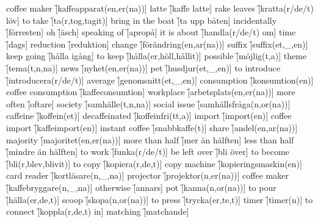 \begin{questions}
    \begin{multicols}{2}
        \raggedcolumns
        \question coffee maker \f[kaffeapparat(en,er(na))]
        \question latte \f[kaffe latte]
        \question rake leaves \f[kratta(r/de/t) löv]
        \question to take \f[ta(r,tog,tagit)]
        \question bring in the boat \f[ta upp båten]
        \question incidentally \f[förresten]
        \question oh \f[äsch]
        \question speaking of \f[apropå]
        \question it is about \f[handla(r/de/t) om]
        \question time \f[dags]
        \question reduction \f[reduktion]
        \question change \f[förändring(en,ar(na))]
        \question suffix \f[suffix(et,\_,en)]
        \question keep going \f[hålla igång]
        \question to keep \f[hålla(er,höll,hållit)]
        \question possible \f[möjlig(t,a)]
        \question theme \f[tema(t,n,na)]
        \question news \f[nyhet(en,er(na))]
        \question pet \f[husdjur(et,\_,en)]
        \question to introduce \f[introducera(r/de/t)]
        \question average \f[genomsnitt(et,\_,en)]
        \question consumption \f[konsumtion(en)]
        \question coffee consumption \f[kaffeconsumtion]
        \question workplace \f[arbetsplats(en,er(na))]
        \question more often \f[oftare]
        \question society \f[samhälle(t,n,na)]
        \question social issue \f[samhällsfråga(n,or(na))]
        \question caffeine \f[koffein(et)]
        \question decaffeinated \f[koffeinfri(tt,a)]
        \question import \f[import(en)]
        \question coffee import \f[kaffeimport(en)]
        \question instant coffee \f[snabbkaffe(t)]
        \question share \f[andel(en,ar(na))]
        \question majority \f[majoritet(en,er(na))]
        \question more than half \f[mer än hälften]
        \question less than half \f[mindre än hälften]
        \question to work \f[funka(r/de/t)]
        \question be left over \f[bli över]
        \question to become \f[bli(r,blev,blivit)]
        \question to copy \f[kopiera(r,de,t)]
        \question copy machine \f[kopieringsmaskin(en)]
        \question card reader \f[kortläsare(n,\_,na)]
        \question projector \f[projektor(n,er(na))]
        \question coffee maker \f[kaffebryggare(n,\_,na)]
        \question otherwise \f[annars]
        \question pot \f[kanna(n,or(na))]
        \question to pour \f[hälla(er,de,t)]
        \question scoop \f[skopa(n,or(na))]
        \question to press \f[trycka(er,te,t)]
        \question timer \f[timer(n)]
        \question to connect \f[koppla(r,de,t) in]
        \question matching \f[matchande]

\end{multicols}
\end{questions}
